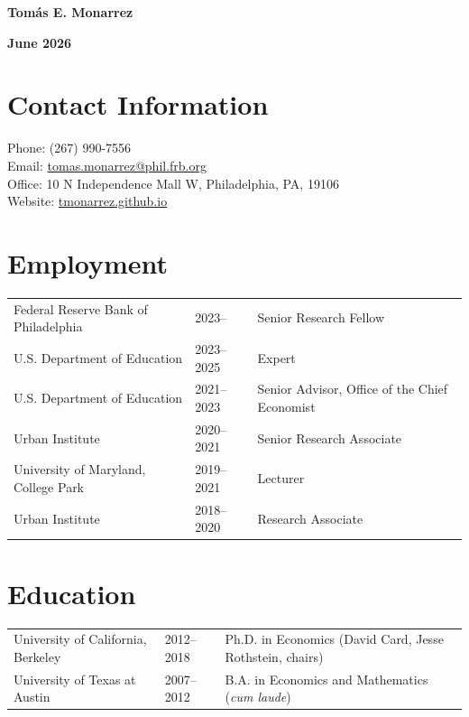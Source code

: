 \documentclass[11pt,letterpaper]{article}
\begin{document}
\begin{minipage}[t]{0.5\textwidth}
{\LARGE \textbf{Tom\'as E. Monarrez}}
\end{minipage}%
\begin{minipage}[t]{0.5\textwidth}
\raggedleft
\textbf{June 2026}
\end{minipage}

\vspace{4pt}

\section*{Contact Information}

Phone: (267) 990-7556 \\
Email: \href{mailto:tomas.monarrez@phil.frb.org}{tomas.monarrez@phil.frb.org} \\
Office: 10 N Independence Mall W, Philadelphia, PA, 19106 \\
Website: \href{https://tmonarrez.github.io}{tmonarrez.github.io}

\section*{Employment}

\begin{tabular}{lll}
Federal Reserve Bank of Philadelphia & 2023-- & Senior Research Fellow \\
U.S. Department of Education & 2023--2025 & Expert \\
U.S. Department of Education & 2021--2023 & Senior Advisor, Office of the Chief Economist \\
Urban Institute & 2020--2021 & Senior Research Associate \\
University of Maryland, College Park & 2019--2021 & Lecturer \\
Urban Institute & 2018--2020 & Research Associate \\
\end{tabular}

\section*{Education}

\begin{tabular}{lll}
University of California, Berkeley & 2012--2018 & Ph.D. in Economics (David Card, Jesse Rothstein, chairs) \\
University of Texas at Austin & 2007--2012 & B.A. in Economics and Mathematics (\textit{cum laude}) \\
\end{tabular}
\end{document}
